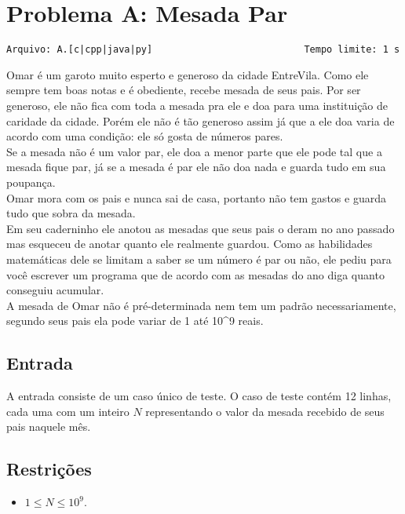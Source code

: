\section{Problema A: Mesada Par}
\vspace{-0.52cm}
\noindent \begin{verbatim}Arquivo: A.[c|cpp|java|py]                           Tempo limite: 1 s
\end{verbatim}

Omar é um garoto muito esperto e generoso da cidade EntreVila. Como ele sempre tem boas notas e é obediente, recebe mesada de seus pais. Por ser generoso, ele não fica com toda a mesada pra ele e doa para uma instituição de caridade da cidade. Porém ele não é tão generoso assim já que a ele doa varia de acordo com uma condição: ele só gosta de números pares. \\
Se a mesada não é um valor par, ele doa a menor parte que ele pode tal que a mesada fique par, já se a mesada é par ele não doa nada e guarda tudo em sua poupança. \\
Omar mora com os pais e nunca sai de casa, portanto não tem gastos e guarda tudo que sobra da mesada. \\
Em seu caderninho ele anotou as mesadas que seus pais o deram no ano passado mas esqueceu de anotar quanto ele realmente guardou. Como as habilidades matemáticas dele se limitam a saber se um número é par ou não, ele pediu para você escrever um programa que de acordo com as mesadas do ano diga quanto conseguiu acumular. \\

A mesada de Omar não é pré-determinada nem tem um padrão necessariamente, segundo seus pais ela pode variar de 1 até 10^{9} reais.

\subsection*{Entrada}

A entrada consiste de um caso único de teste. O caso de teste contém 12 linhas, cada uma com um inteiro $N$ representando o valor da mesada recebido de seus pais naquele mês.

\subsection*{Restrições}
\begin{itemize}
    \item $1 \le N \le 10^{9}$.
\end{itemize}

